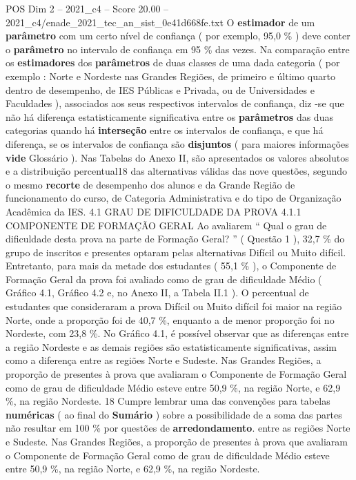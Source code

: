 \begin{textsample}{POS Dim 2 – 2021\_c4 – Score 20.00 – 2021\_c4/enade\_2021\_tec\_an\_sist\_0e41d668fe.txt}
O \textbf{estimador} de um \textbf{parâmetro} com um certo nível de confiança ( por exemplo, 95,0 \% ) deve conter o \textbf{parâmetro} no intervalo de confiança em 95 \% das vezes.
Na comparação entre os \textbf{estimadores} dos \textbf{parâmetros} de duas classes de uma dada categoria ( por exemplo : Norte e Nordeste nas Grandes Regiões, de primeiro e último quarto dentro de desempenho, de IES Públicas e Privada, ou de Universidades e Faculdades ), associados aos seus respectivos intervalos de confiança, diz -se que não há diferença estatisticamente significativa entre os \textbf{parâmetros} das duas categorias quando há \textbf{interseção} entre os intervalos de confiança, e que há diferença, se os intervalos de confiança são \textbf{disjuntos} ( para maiores informações \textbf{vide} Glossário ).
Nas Tabelas do Anexo II, são apresentados os valores absolutos e a distribuição percentual18 das alternativas válidas das nove questões, segundo o mesmo \textbf{recorte} de desempenho dos alunos e da Grande Região de funcionamento do curso, de Categoria Administrativa e do tipo de Organização Acadêmica da IES. 4.1 GRAU DE DIFICULDADE DA PROVA 4.1.1 COMPONENTE DE FORMAÇÃO GERAL Ao avaliarem “ Qual o grau de dificuldade desta prova na parte de Formação Geral? ” ( Questão 1 ), 32,7 \% do grupo de inscritos e presentes optaram pelas alternativas Difícil ou Muito difícil.
Entretanto, para mais da metade dos estudantes ( 55,1 \% ), o Componente de Formação Geral da prova foi avaliado como de grau de dificuldade Médio ( Gráfico 4.1, Gráfico 4.2 e, no Anexo II, a Tabela II.1 ).
O percentual de estudantes que consideraram a prova Difícil ou Muito difícil foi maior na região Norte, onde a proporção foi de 40,7 \%, enquanto a de menor proporção foi no Nordeste, com 23,8 \%.
No Gráfico 4.1, é possível observar que as diferenças entre a região Nordeste e as demais regiões são estatisticamente significativas, assim como a diferença entre as regiões Norte e Sudeste.
Nas Grandes Regiões, a proporção de presentes à prova que avaliaram o Componente de Formação Geral como de grau de dificuldade Médio esteve entre 50,9 \%, na região Norte, e 62,9 \%, na região Nordeste. 18 Cumpre lembrar uma das convenções para tabelas \textbf{numéricas} ( ao final do \textbf{Sumário} ) sobre a possibilidade de a soma das partes não resultar em 100 \% por questões de \textbf{arredondamento}. entre as regiões Norte e Sudeste.
Nas Grandes Regiões, a proporção de presentes à prova que avaliaram o Componente de Formação Geral como de grau de dificuldade Médio esteve entre 50,9 \%, na região Norte, e 62,9 \%, na região Nordeste.

\end{textsample}
